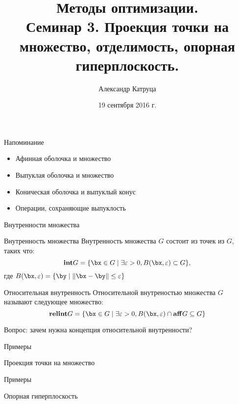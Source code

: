 \documentclass[12pt,russian]{beamer}
\title[Семинар 3]{Методы оптимизации. \\
 Семинар 3. Проекция точки на множество, отделимость, опорная гиперплоскость.}
\author{Александр Катруца}
\institute{Московский физико-технический институт,\\
Факультет Управления и Прикладной Математики}
\date{19 сентября 2016 г.}
\newcommand{\relint}{\mathbf{relint}}
\newcommand{\inter}{\mathbf{int}}
\begin{document}
\begin{frame}
\maketitle
\end{frame}

\begin{frame}{Напоминание}
\begin{itemize}
\item Афинная оболочка и множество
\item Выпуклая оболочка и множество
\item Коническая оболочка и выпуклый конус
\item Операции, сохраняющие выпуклость
\end{itemize}
\end{frame}

\begin{frame}{Внутренности множества}

\begin{block}{Внутренность множества}
Внутренность множества $G$ состоит из точек из $G$, таких что:
\[ 
\inter G = \{ \bx \in G \; | \; \exists \varepsilon > 0, B(\bx, \varepsilon) \subset G\},
\]
где $B(\bx, \varepsilon) = \{ \by \; | \; \| \bx - \by \| \leq \varepsilon \}$
\end{block}

\begin{block}{Относительная внутренность}
Относительной внутреностью множества $G$ называют следующее множество: 
\[
\relint G = \{ \bx \in G \; | \; \exists \varepsilon > 0,  B(\bx, \varepsilon) \cap \mathbf{aff} G \subseteq G \}
\]
\end{block}
Вопрос: зачем нужна концепция относительной внутренности?
\end{frame}

\begin{frame}{Примеры}

\end{frame}

\begin{frame}{Проекция точки на множество}

\end{frame}

\begin{frame}{Примеры}

\end{frame}

\begin{frame}{Опорная гиперплоскость}

\end{frame}
\end{document}

